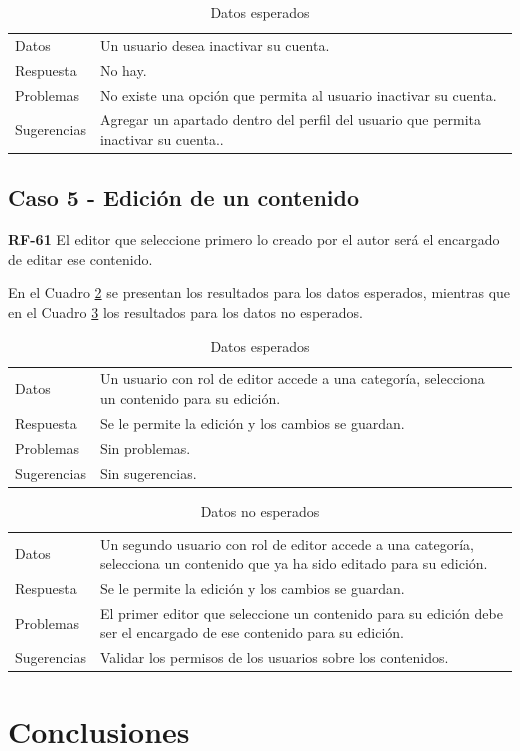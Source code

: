 \documentclass[10pt,times,twocolumn]{article}
\begin{document}
\begin{table}[H]
    \centering
    \begin{tabular}{p{3cm}p{4cm}}
        \rowcolor{gray!15}
        Datos & Un usuario desea inactivar su cuenta.\\
       	Respuesta & No hay.\\
       	Problemas & No existe una opción que permita al usuario inactivar su cuenta.\\
       	Sugerencias & Agregar un apartado dentro del perfil del usuario que permita inactivar su cuenta..\\
    \end{tabular}
    \caption{Datos esperados}
    \label{tab:caso4_esperado}
\end{table}

\subsection{Caso 5 - Edición de un contenido}

\textbf{RF-61} El editor que seleccione primero lo creado por el autor será el encargado de editar ese contenido. 

En el Cuadro \ref{tab:caso5_esperado} se presentan los resultados para los datos esperados, mientras que en el Cuadro \ref{tab:caso5_no_esperado} los resultados para los datos no esperados.

\begin{table}[H]
    \centering
    \begin{tabular}{p{3cm}p{4cm}}
        \rowcolor{gray!15}
        Datos & Un usuario con rol de editor accede a una categoría, selecciona un contenido para su edición.\\
       	Respuesta & Se le permite la edición y los cambios se guardan.\\
       	Problemas & Sin problemas.\\
       	Sugerencias & Sin sugerencias.\\
    \end{tabular}
    \caption{Datos esperados}
    \label{tab:caso5_esperado}
\end{table}

\begin{table}[H]
    \centering
    \begin{tabular}{p{3cm}p{4cm}}
        \rowcolor{gray!15}
        Datos & Un segundo usuario con rol de editor accede a una categoría, selecciona un contenido que ya ha sido editado para su edición.\\
        Respuesta & Se le permite la edición y los cambios se guardan.\\
       	Problemas & El primer editor que seleccione un contenido para su edición debe ser el encargado de ese contenido para su edición.\\
       	Sugerencias & Validar los permisos de los usuarios sobre los contenidos.\\
    \end{tabular}
    \caption{Datos no esperados}
    \label{tab:caso5_no_esperado}
\end{table}

\section{Conclusiones}

\printbibliography
\end{document}
